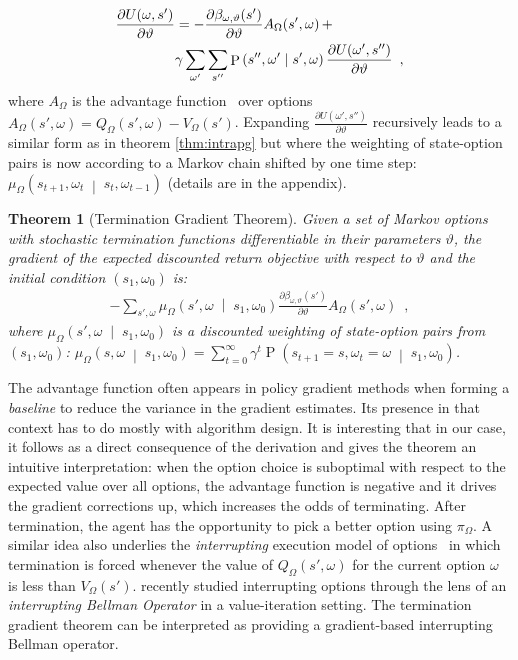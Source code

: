 \documentclass[letterpaper]{article}
\def\given{\;\middle\vert\;}
\DeclareMathOperator{\prob}{P}
\def\options{\Omega}
\def\defeq{=}\newcommand{\deriv}[2][]{\frac{\partial#1}{\partial#2}}
\newtheorem{theorem}{Theorem}
\def\option{\omega}
\def\termparams{\vartheta}
\begin{document}
\begin{align}
\deriv[U(\option, s')]{\termparams} &=-\deriv[\beta_{\option, \termparams}(s')]{\termparams} A_\options(s', \option) \, + \notag\\
&\gamma \sum_{\option'} \sum_{s''} \prob\left(s'', \option' \given s', \omega\right) \deriv[U(\option', s'')]{\termparams} \enspace, \label{eq:du-recursive}
\end{align}
where $A_{\Omega}$  is the advantage function~\cite{Baird1993} over options
$A_\Omega(s', \omega) = Q_\Omega(s', \omega) - V_\Omega(s')$. Expanding $ \deriv[U(\option', s'')]{\termparams} $ recursively leads to a
similar form as in theorem \eqref{thm:intrapg} but where the weighting of state-option
pairs is now according to a Markov chain shifted by
one time step: $\mu_\Omega\left( s_{t+1}, \omega_t \given s_t, \omega_{t-1}\right)$ (details are in the appendix).
\begin{theorem}[Termination Gradient Theorem]\label{thm:term}
Given a set of Markov options with stochastic termination functions differentiable
in their parameters $\vartheta$, the gradient of the expected discounted return objective
with respect to $\vartheta$ and the initial condition $(s_1, \omega_0)$ is:
\begin{align*}
-\sum_{s', \omega} \mu_\Omega\left(s', \omega \given s_1, \omega_0\right) \deriv[\beta_{\option,\termparams}(s')]{\termparams} A_\options(s', \option) \enspace ,
\end{align*}
where $\mu_\options\left(s', \omega \given s_1, \omega_0\right)$ is a discounted weighting of state-option pairs
from $(s_1, \omega_0)$: $\mu_\Omega\left(s, \omega \given s_1, \omega_0\right) \defeq \sum_{t=0}^\infty \gamma^t \prob\left( s_{t+1} = s, \omega_t = \omega \given s_1, \omega_0 \right)$.
\end{theorem}

The advantage function often appears in policy gradient methods
\cite{Sutton1999pg} when forming a \textit{baseline} to
reduce the variance in the gradient estimates. Its presence in that context has to do
mostly with  algorithm design.  It is interesting that in our case,
it follows as a direct consequence of the derivation and gives the theorem
an intuitive interpretation: when the option choice is suboptimal with respect
to the expected value over all options, the  advantage function is negative and it drives
the gradient corrections up, which increases  the odds of terminating. After termination,
the agent has the opportunity to pick a better option using $\pi_\Omega$.
A similar idea also underlies the \textit{interrupting} execution model of
options~\cite{Sutton1999opt} in which termination is forced whenever the value
of $Q_\Omega(s', \omega)$ for the current option $\omega$ is less than $V_\Omega(s')$.
\cite{Mann2014} recently studied interrupting options through the lens of an
\textit{interrupting Bellman Operator} in a value-iteration setting. The termination
gradient theorem can be interpreted as providing a gradient-based interrupting Bellman operator.
\end{document}
